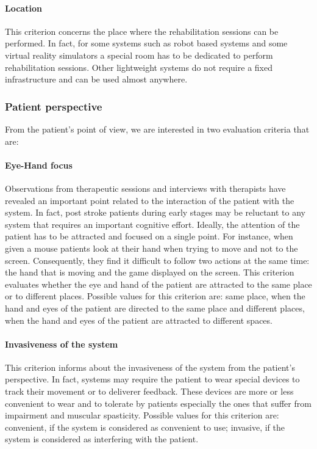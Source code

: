 \documentclass[preprint,authoryear,12pt]{elsarticle}
\begin{document}
\paragraph{Location}
\par
This criterion concerns the place where the rehabilitation sessions can be performed. In fact, for some systems such as robot based systems and some virtual reality simulators a special room has to be dedicated to perform rehabilitation sessions. Other lightweight systems do not require a fixed infrastructure and can be used almost anywhere.

\subsubsection{Patient perspective}
From the patient's point of view, we are interested in two evaluation criteria that are:
\par
\paragraph{Eye-Hand focus}
\par
Observations from therapeutic sessions and interviews with therapists have revealed an important point related to the interaction of the patient with the system. In fact, post stroke patients during early stages may be reluctant to any system that requires an important cognitive effort. Ideally, the attention of the patient has to be attracted and focused on a single point. For instance, when given a mouse patients look at their hand when trying to move and not to the screen. Consequently, they find it difficult to follow two actions at the same time: the hand that is moving and the game displayed on the screen.
This criterion evaluates whether the eye and hand of the patient are attracted to the same place or to different places. Possible values for this criterion are: same place, when the hand and eyes of the patient are directed to the same place and different places, when the hand and eyes of the patient are attracted to different spaces.
\par
\paragraph{Invasiveness of the system}
\par
This criterion informs about the invasiveness of the system from the patient's perspective. In fact, systems may require the patient to wear special devices to track their movement or to deliverer feedback. These devices are more or less convenient to wear and to tolerate by patients especially the ones that suffer from impairment and muscular spasticity. Possible values for this criterion are: convenient, if the system is considered as convenient to use; invasive, if the system is considered as interfering with the patient.
\end{document}
